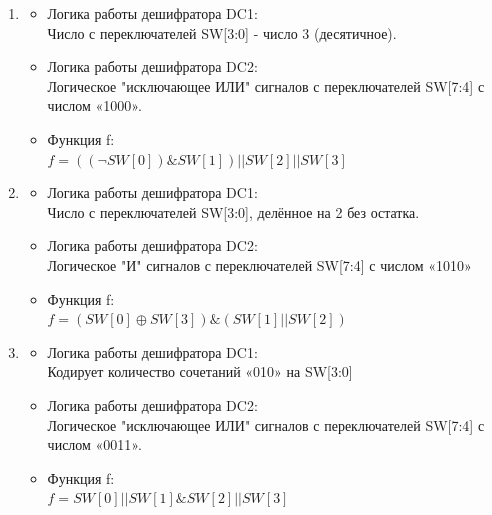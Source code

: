 \begin{enumerate}
    \item{
    \begin{itemize}
    \item Логика работы дешифратора DC1: \\
      Число с переключателей SW[3:0]  - число 3 (десятичное).
    \item Логика работы дешифратора DC2: \\ 
      Логическое "исключающее ИЛИ" сигналов с переключателей SW[7:4] с числом «1000».
    \item Функция f:\\
      $f = ((\neg SW[0]) \& SW[1]) || SW[2] || SW[3]$
    \end{itemize}
  }

    \item{
    \begin{itemize}
    \item Логика работы дешифратора DC1: \\
      Число с переключателей SW[3:0], делённое на 2 без остатка.
    \item Логика работы дешифратора DC2: \\ 
      Логическое "И" сигналов с переключателей SW[7:4] с числом «1010»
    \item Функция f:\\
      $f = (SW[0] \oplus SW[3]) \& (SW[1] || SW[2])$
    \end{itemize}
  }

    \item{
    \begin{itemize}
    \item Логика работы дешифратора DC1: \\
      Кодирует количество сочетаний «010» на SW[3:0]
    \item Логика работы дешифратора DC2: \\ 
      Логическое "исключающее ИЛИ" сигналов с переключателей SW[7:4] с числом «0011».
    \item Функция f:\\
      $f = SW[0] || SW[1] \& SW[2] || SW[3]$
    \end{itemize}
  }



\end{enumerate}

